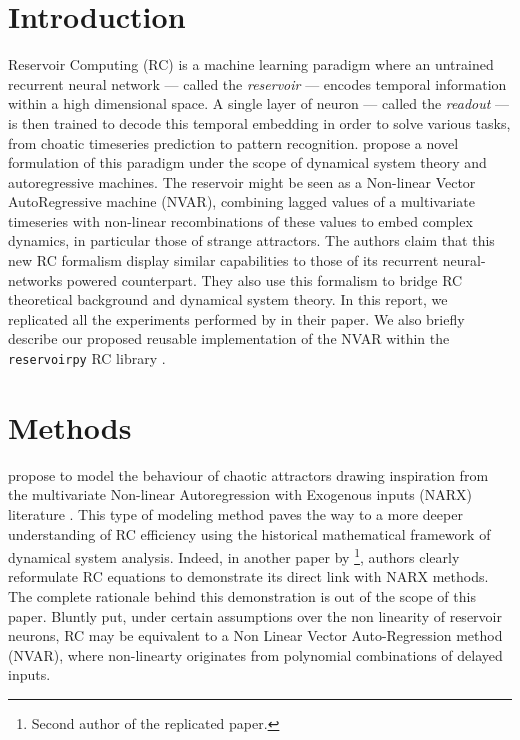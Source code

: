 
\section{Introduction}

Reservoir Computing (RC) is a machine learning paradigm where
an untrained recurrent neural network --- called the \textit{reservoir} --- encodes
temporal information within a high dimensional space.
A single layer of neuron --- called the \textit{readout} ---
is then trained to decode this temporal embedding in order
to solve various tasks, from choatic timeseries prediction to pattern recognition.
\citet{gauthier2021next} propose a novel formulation of this paradigm under
the scope of dynamical system theory and autoregressive machines.
The reservoir might be seen as a Non-linear Vector AutoRegressive machine (NVAR),
combining lagged values of a multivariate timeseries
with non-linear recombinations of these values to embed complex dynamics,
in particular those of strange attractors.
The authors claim that this new RC formalism display similar capabilities to those
of its recurrent neural-networks powered counterpart. They also use this formalism
to bridge RC theoretical background and dynamical system theory.
In this report, we replicated all the experiments performed by \citet{gauthier2021next}
in their paper. We also briefly describe our proposed reusable implementation
of the NVAR within the \texttt{reservoirpy} RC library \supercite{trouvain2020}.

\section{Methods}

\citet{gauthier2021next} propose to model the behaviour of chaotic attractors drawing inspiration
from the multivariate Non-linear Autoregression with Exogenous inputs (NARX) literature \cite{billings2013}.
This type of modeling method paves the way to a more deeper understanding of RC efficiency using
the historical mathematical framework of dynamical system analysis. Indeed, in another paper by \citet{bollt2021}
\footnote{Second author of the replicated paper.}, authors clearly reformulate RC equations to demonstrate
its direct link with NARX methods. The complete rationale behind this demonstration is out of the scope
of this paper. Bluntly put, under certain assumptions over the non linearity of reservoir neurons,
RC may be equivalent to a Non Linear Vector Auto-Regression method (NVAR), where non-linearty originates
from polynomial combinations of delayed inputs.

